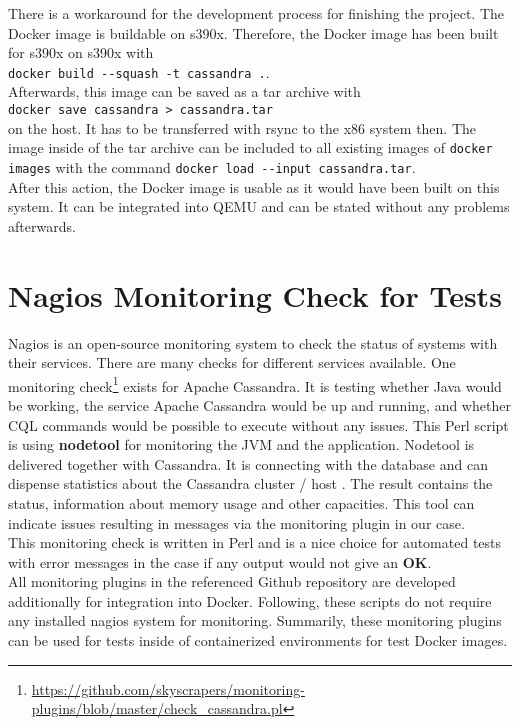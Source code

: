 There is a workaround for the development process for finishing the project. The Docker image is buildable on s390x. Therefore, the Docker image has been built for s390x on s390x with \\  
\lstinline!docker build --squash -t cassandra .!. \\
Afterwards, this image can be saved as a tar archive with \\
\lstinline!docker save cassandra > cassandra.tar!\\ 
on the host. It has to be transferred with rsync to the x86 system then. The image inside of the tar archive can be included to all existing images of \lstinline!docker images! with the command 
\lstinline!docker load --input cassandra.tar!. \\
After this action, the Docker image is usable as it would have been built on this system. 
It can be integrated into QEMU and can be stated without any problems afterwards.

\section{Nagios Monitoring Check for Tests} \label{monitoring}

Nagios is an open-source monitoring system to check the status of systems with their services. There are many checks for different services available. One monitoring check\footnote{\url{https://github.com/skyscrapers/monitoring-plugins/blob/master/check_cassandra.pl}} exists for Apache Cassandra. It is testing whether Java would be working, the service Apache Cassandra would be up and running, and whether CQL commands would be possible to execute without any issues. This Perl script is using \textbf{nodetool} for monitoring the JVM and the application. Nodetool is delivered together with Cassandra. It is connecting with the database and can dispense statistics about the Cassandra cluster / host \cite[~p.256]{Carpenter2020}. The result contains the status, information about memory usage and other capacities. This tool can indicate issues resulting in messages via the monitoring plugin in our case.\\
This monitoring check is written in Perl and is a nice choice for automated tests with error messages in the case if any output would not give an \textbf{OK}. \\
All monitoring plugins in the referenced Github repository are developed additionally for integration into Docker. Following, these scripts do not require any installed nagios system for monitoring.
Summarily, these monitoring plugins can be used for tests inside of containerized environments for test Docker images.

